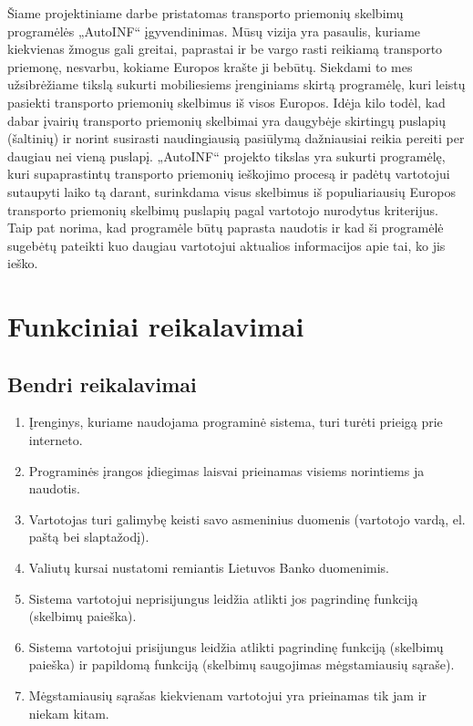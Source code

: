 \documentclass[12pt]{article}
\begin{document}
	Šiame projektiniame darbe pristatomas transporto priemonių skelbimų programėlės „AutoINF“ įgyvendinimas. Mūsų vizija yra pasaulis, kuriame kiekvienas žmogus gali greitai, paprastai ir be vargo rasti reikiamą transporto priemonę, nesvarbu, kokiame Europos krašte ji bebūtų. Siekdami to mes užsibrėžiame tikslą sukurti mobiliesiems įrenginiams skirtą programėlę, kuri leistų pasiekti transporto priemonių skelbimus iš visos Europos. Idėja kilo todėl, kad dabar įvairių transporto priemonių skelbimai yra daugybėje skirtingų puslapių (šaltinių) ir norint susirasti naudingiausią pasiūlymą dažniausiai reikia pereiti per daugiau nei vieną puslapį. „AutoINF“ projekto tikslas yra sukurti programėlę, kuri supaprastintų transporto priemonių ieškojimo procesą ir padėtų vartotojui sutaupyti laiko tą darant, surinkdama visus skelbimus iš populiariausių Europos transporto priemonių skelbimų puslapių pagal vartotojo nurodytus kriterijus. Taip pat norima, kad programėle būtų paprasta naudotis ir kad ši programėlė sugebėtų pateikti kuo daugiau vartotojui aktualios informacijos apie tai, ko jis ieško.
	\pagebreak
	
	\section*{Funkciniai reikalavimai}
	
	\subsection{Bendri reikalavimai}
	\begin{enumerate}[labelindent=10pt,leftmargin=2.2cm]
		\item Įrenginys, kuriame naudojama programinė sistema, turi turėti prieigą prie interneto.
		\item Programinės įrangos įdiegimas laisvai prieinamas visiems norintiems ja naudotis.
		\item Vartotojas turi galimybę keisti savo asmeninius duomenis (vartotojo vardą, el. paštą bei slaptažodį).
		\item Valiutų kursai nustatomi remiantis Lietuvos Banko duomenimis.
		\item Sistema vartotojui neprisijungus leidžia atlikti jos pagrindinę funkciją (skelbimų paieška).
		\item Sistema vartotojui prisijungus leidžia atlikti pagrindinę funkciją (skelbimų paieška) ir papildomą funkciją (skelbimų saugojimas mėgstamiausių sąraše).
		\item Mėgstamiausių sąrašas kiekvienam vartotojui yra prieinamas tik jam ir niekam kitam.
	\end{enumerate}
	\pagebreak
	
\end{document}
